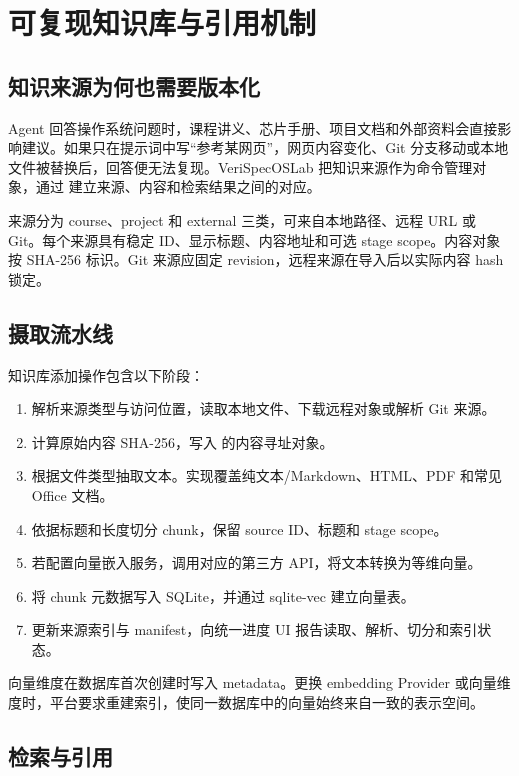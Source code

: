 \chapter{可复现知识库与引用机制}

\section{知识来源为何也需要版本化}

Agent 回答操作系统问题时，课程讲义、芯片手册、项目文档和外部资料会直接影响建议。如果只在提示词中写``参考某网页''，网页内容变化、Git 分支移动或本地文件被替换后，回答便无法复现。VeriSpecOSLab 把知识来源作为命令管理对象，通过  建立来源、内容和检索结果之间的对应。

来源分为 course、project 和 external 三类，可来自本地路径、远程 URL 或 Git。每个来源具有稳定 ID、显示标题、内容地址和可选 stage scope。内容对象按 SHA-256 标识。Git 来源应固定 revision，远程来源在导入后以实际内容 hash 锁定。

\section{摄取流水线}

知识库添加操作包含以下阶段：

\begin{enumerate}
  \item 解析来源类型与访问位置，读取本地文件、下载远程对象或解析 Git 来源。
  \item 计算原始内容 SHA-256，写入  的内容寻址对象。
  \item 根据文件类型抽取文本。实现覆盖纯文本/Markdown、HTML、PDF 和常见 Office 文档。
  \item 依据标题和长度切分 chunk，保留 source ID、标题和 stage scope。
  \item 若配置向量嵌入服务，调用对应的第三方 API，将文本转换为等维向量。
  \item 将 chunk 元数据写入 SQLite，并通过 sqlite-vec 建立向量表。
  \item 更新来源索引与 manifest，向统一进度 UI 报告读取、解析、切分和索引状态。
\end{enumerate}

向量维度在数据库首次创建时写入 metadata。更换 embedding Provider 或向量维度时，平台要求重建索引，使同一数据库中的向量始终来自一致的表示空间。

\section{检索与引用}

